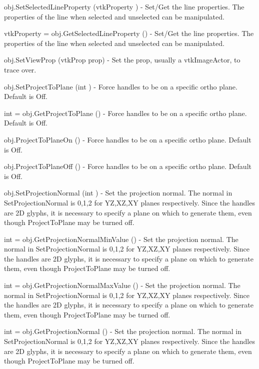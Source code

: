 \begin{DoxyItemize}
\item {\ttfamily obj.\-Set\-Selected\-Line\-Property (vtk\-Property )} -\/ Set/\-Get the line properties. The properties of the line when selected and unselected can be manipulated.  
\item {\ttfamily vtk\-Property = obj.\-Get\-Selected\-Line\-Property ()} -\/ Set/\-Get the line properties. The properties of the line when selected and unselected can be manipulated.  
\item {\ttfamily obj.\-Set\-View\-Prop (vtk\-Prop prop)} -\/ Set the prop, usually a vtk\-Image\-Actor, to trace over.  
\item {\ttfamily obj.\-Set\-Project\-To\-Plane (int )} -\/ Force handles to be on a specific ortho plane. Default is Off.  
\item {\ttfamily int = obj.\-Get\-Project\-To\-Plane ()} -\/ Force handles to be on a specific ortho plane. Default is Off.  
\item {\ttfamily obj.\-Project\-To\-Plane\-On ()} -\/ Force handles to be on a specific ortho plane. Default is Off.  
\item {\ttfamily obj.\-Project\-To\-Plane\-Off ()} -\/ Force handles to be on a specific ortho plane. Default is Off.  
\item {\ttfamily obj.\-Set\-Projection\-Normal (int )} -\/ Set the projection normal. The normal in Set\-Projection\-Normal is 0,1,2 for Y\-Z,X\-Z,X\-Y planes respectively. Since the handles are 2\-D glyphs, it is necessary to specify a plane on which to generate them, even though Project\-To\-Plane may be turned off.  
\item {\ttfamily int = obj.\-Get\-Projection\-Normal\-Min\-Value ()} -\/ Set the projection normal. The normal in Set\-Projection\-Normal is 0,1,2 for Y\-Z,X\-Z,X\-Y planes respectively. Since the handles are 2\-D glyphs, it is necessary to specify a plane on which to generate them, even though Project\-To\-Plane may be turned off.  
\item {\ttfamily int = obj.\-Get\-Projection\-Normal\-Max\-Value ()} -\/ Set the projection normal. The normal in Set\-Projection\-Normal is 0,1,2 for Y\-Z,X\-Z,X\-Y planes respectively. Since the handles are 2\-D glyphs, it is necessary to specify a plane on which to generate them, even though Project\-To\-Plane may be turned off.  
\item {\ttfamily int = obj.\-Get\-Projection\-Normal ()} -\/ Set the projection normal. The normal in Set\-Projection\-Normal is 0,1,2 for Y\-Z,X\-Z,X\-Y planes respectively. Since the handles are 2\-D glyphs, it is necessary to specify a plane on which to generate them, even though Project\-To\-Plane may be turned off.  

\end{DoxyItemize}
